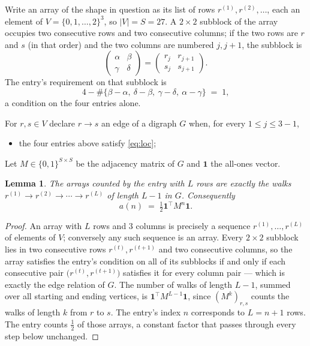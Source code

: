\documentclass[11pt,a4paper]{article}
\theoremstyle{plain}
\newtheorem{lemma}[theorem]{Lemma}
\theoremstyle{definition}
\begin{document}
Write an array of the shape in question as its list of rows
$r^{(1)},r^{(2)},\dots$, each an element of
$V=\{0,1,\dots,2\}^{3}$, so $|V|=S=27$. A $2\times2$ subblock of the array
occupies two consecutive rows and two consecutive columns; if the two rows are $r$
and $s$ (in that order) and the two columns are numbered $j,j+1$,
the subblock is
\[
\begin{pmatrix}\alpha&\beta\\\gamma&\delta\end{pmatrix}=\begin{pmatrix}r_j&r_{j+1}\\s_j&s_{j+1}\end{pmatrix}.
\]
The entry's requirement on that subblock is
\begin{equation}\label{eq:loc}
4-\#\{\beta-\alpha,\ \delta-\beta,\ \gamma-\delta,\ \alpha-\gamma\}\;=\;1,
\end{equation}
a condition on the four entries alone.

For $r,s\in V$ declare $r\to s$ an edge of a digraph $G$ when, for every
$1\le j\le 3-1$,
\begin{itemize}
\item the four entries above satisfy \eqref{eq:loc};

\end{itemize}
Let $M\in\{0,1\}^{S\times S}$ be the adjacency matrix of $G$ and $\mathbf{1}$ the
all-ones vector.

\begin{lemma}\label{lem:walk}
The arrays counted by the entry with $L$ rows are exactly the walks
$r^{(1)}\to r^{(2)}\to\cdots\to r^{(L)}$ of length $L-1$ in $G$. Consequently
\[
a(n)\;=\;\tfrac1{2}\mathbf{1}^{\!\top}M^{n}\mathbf{1} .
\]
\end{lemma}

\begin{proof}
An array with $L$ rows and $3$ columns is precisely a sequence
$r^{(1)},\dots,r^{(L)}$ of elements of $V$; conversely any such sequence is an array.
Every $2\times2$ subblock lies in two consecutive rows $r^{(t)},r^{(t+1)}$ and two
consecutive columns, so the array satisfies the entry's condition on all of its subblocks
if and only if each consecutive pair $\bigl(r^{(t)},r^{(t+1)}\bigr)$ satisfies it for
every column pair --- which is exactly the edge relation of $G$. The number of walks of
length $L-1$, summed over all starting and ending vertices, is
$\mathbf{1}^{\!\top}M^{L-1}\mathbf{1}$, since $(M^{k})_{r,s}$ counts the walks of
length $k$ from $r$ to $s$. The entry's index $n$ corresponds to $L=n+1$ rows. The entry counts $\tfrac1{2}$ of those arrays, a constant factor that passes through every step below unchanged.
\end{proof}
\end{document}
